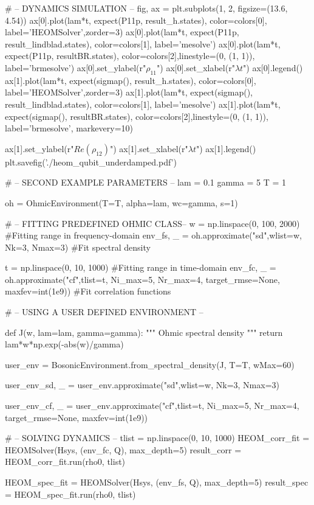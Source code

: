 # -- DYNAMICS SIMULATION --
fig, ax = plt.subplots(1, 2, figsize=(13.6, 4.54))
ax[0].plot(lam*t, expect(P11p, result_h.states),
           color=colors[0], label='HEOMSolver',zorder=3)
ax[0].plot(lam*t, expect(P11p, result_lindblad.states),
            color=colors[1], label='mesolve')
ax[0].plot(lam*t, expect(P11p, resultBR.states),
           color=colors[2],linestyle=(0, (1, 1)), label='brmesolve')
ax[0].set_ylabel(r"$\rho_{11}$")
ax[0].set_xlabel(r"$\lambda t$")
ax[0].legend()
ax[1].plot(lam*t, expect(sigmap(), result_h.states),
           color=colors[0], label='HEOMSolver',zorder=3)
ax[1].plot(lam*t, expect(sigmap(), result_lindblad.states),
        color=colors[1], label='mesolve')
ax[1].plot(lam*t, expect(sigmap(), resultBR.states),
           color=colors[2],linestyle=(0, (1, 1)), label='brmesolve', markevery=10)

ax[1].set_ylabel(r"$Re(\rho_{12})$")
ax[1].set_xlabel(r"$\lambda t$")
ax[1].legend()
plt.savefig('./heom_qubit_underdamped.pdf')

# -- SECOND EXAMPLE PARAMETERS --
lam = 0.1
gamma = 5
T = 1

oh = OhmicEnvironment(T=T, alpha=lam, wc=gamma, s=1)

# -- FITTING PREDEFINED OHMIC CLASS--
w = np.linspace(0, 100, 2000) #Fitting range in frequency-domain
env_fs, _ = oh.approximate("sd",wlist=w, Nk=3, Nmax=3) #Fit spectral density


t = np.linspace(0, 10, 1000) #Fitting range in time-domain
env_fc, _ = oh.approximate("cf",tlist=t, Ni_max=5, Nr_max=4, 
                            target_rmse=None, maxfev=int(1e9)) #Fit correlation functions


# -- USING A USER DEFINED ENVIRONMENT --


def J(w, lam=lam, gamma=gamma):
    """ 
    Ohmic spectral density
    """
    return lam*w*np.exp(-abs(w)/gamma)


user_env = BosonicEnvironment.from_spectral_density(J, T=T, wMax=60)

user_env_sd, _ = user_env.approximate("sd",wlist=w, Nk=3, Nmax=3)

user_env_cf, _ = user_env.approximate("cf",tlist=t, Ni_max=5, Nr_max=4, target_rmse=None, maxfev=int(1e9))



# -- SOLVING DYNAMICS --
tlist = np.linspace(0, 10, 1000)
HEOM_corr_fit = HEOMSolver(Hsys, (env_fc, Q), max_depth=5)
result_corr = HEOM_corr_fit.run(rho0, tlist)

HEOM_spec_fit = HEOMSolver(Hsys, (env_fs, Q), max_depth=5)
result_spec = HEOM_spec_fit.run(rho0, tlist)


